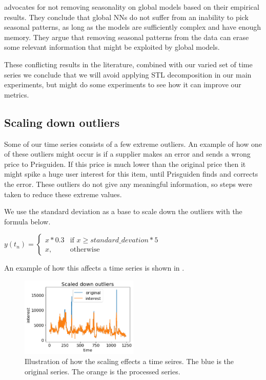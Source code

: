 \cite{Montero-Manso2021} advocates for not removing seasonality on global models based on their empirical results.
They conclude that global NNs do not suffer from an inability to pick seasonal patterns,
as long as the models are sufficiently complex and have enough memory. They argue that removing
seasonal patterns from the data can erase some relevant information that might be exploited by global models.


These conflicting results in the literature, combined with our varied set of time series
we conclude that we will avoid applying STL decomposition in our main experiments,
but might do some experiments to see how it can improve our metrics.

\subsection{Scaling down outliers}
\label{section:Data:Preprocessing:scale-down-outliers}
Some of our time series consists of a few extreme outliers. An example of
how one of these outliers might occur is if a supplier makes an error and sends
a wrong price to Prisguiden. If this price is much lower than the original price then
it might spike a huge user interest for this item, until Prisguiden finds and corrects the error.
These outliers do not give any meaningful information, so steps were taken to reduce these extreme values.

We use the standard deviation as a base to scale down the outliers with the formula below.

$y(t_n)=
  \begin{cases}
    x * 0.3 & \text{if } x\geq standard\_devation * 5 \\
    x,      & \text{otherwise}
  \end{cases}$

An example of how this affects a time series is shown in .
\begin{figure}[h!]
  \centering
  \includegraphics[width=0.5\textwidth]{./figs/code_generated/data_exploration/scaled_down_outliers.png}
  \hfill
  \caption{Illustration of how the scaling effects a time seires. The blue is the original series. The orange is the processed series.}
  \label{fig:illustration:scaled-down-outliers}
\end{figure}

